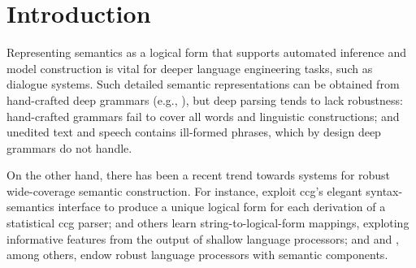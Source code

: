 \section{Introduction} \label{sec:intro}

Representing semantics as a logical form that supports automated
inference and model construction is vital for deeper language
engineering tasks, such as dialogue systems.  Such detailed semantic
representations can be obtained from hand-crafted deep grammars (e.g.,
\cite{butt:etal:1999,copestake:flickinger:2000}), but deep parsing
tends to lack robustness: hand-crafted grammars fail to cover all
words and linguistic constructions; and unedited text and speech
contains ill-formed phrases, which by design deep grammars do not
handle.

On the other hand, there has been a recent trend towards systems for
robust wide-coverage semantic construction.  For instance,
\cite{bos:etal:2004} exploit
{\sc ccg}'s elegant syntax-semantics interface to produce a unique
logical form for each derivation of
a statistical {\sc ccg} parser;
\cite{zettlemoyer:collins:2007} and others learn
string-to-logical-form mappings, exploting informative features from
the output of
shallow language processors; and \cite{copestake:2003} and
\cite{frank:2004}, among others,
endow robust language processors with semantic components.

